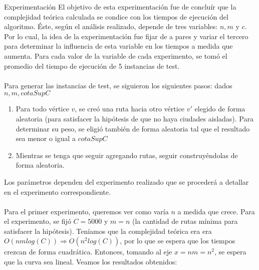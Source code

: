 \begin{subsection}{Experimentaci\'{o}n}
El objetivo de esta experimentaci\'{o}n fue de conclu\'{i}r que la complejidad te\'{o}rica calculada se condice con los tiempos de ejecuci\'{o}n del algoritmo. \'{E}ste, seg\'{u}n el an\'{a}lisis realizado, depende de tres variables: $n, m \text{ y } c$. Por lo cual, la idea de la experimentaci\'{o}n fue fijar de a pares y variar el tercero para determinar la influencia de esta variable en los tiempos a medida que aumenta. Para cada valor de la variable de cada experimento, se tom\'{o} el promedio del tiempo de ejecuci\'{o}n de 5 instancias de test.  \\ \\
Para generar las instancias de test, se siguieron los siguientes pasos: dados $n, m, cotaSupC$
\begin{enumerate}
  \item{Para todo v\'{e}rtice $v$, se cre\'{o} una ruta hacia otro v\'{e}rtice $v'$ elegido de forma aleatoria (para satisfacer la hip\'{o}tesis de que no haya ciudades aisladas). Para determinar su peso, se eligi\'{o} tambi\'{e}n de forma aleatoria tal que el resultado sea menor o igual a $cotaSupC$}
    \item{Mientras se tenga que seguir agregando rutas, seguir construyéndolas de forma aleatoria.}
\end{enumerate}
Los par\'{a}metros dependen del experimento realizado que se proceder\'{a} a detallar en el experimento correspondiente. \\ \\ 
Para el primer experimento, queremos ver como var\'{i}a $n$ a medida que crece. Para el experimento, se fij\'{o} $C=5000$ y $m=n$ (la cantidad de rutas m\'{i}nima para satisfacer la hip\'{o}tesis). Ten\'{i}amos que la complejidad te\'{o}rica era era $O(nmlog(C)) \Rightarrow O(n^2log(C))$, por lo que se espera que los tiempos crezcan de forma cuadr\'{a}tica. Entonces, tomando al eje $x=nm=n^2$, se espera que la curva sea lineal. Veamos los resultados obtenidos: 

\begin{figure}[H]
\centering
{}
\end{figure}


\end{subsection}
